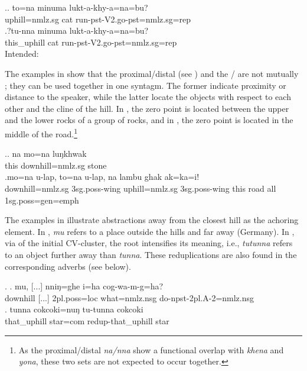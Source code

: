 \ex.\ag. to=na minuma lukt-a-khy-a=na=bu?\\
uphill{\sc =nmlz.sg} cat run{\sc [3sg]-pst-V2.go-pst=nmlz.sg=rep}\\
\bg.?tu-nna minuma lukt-a-khy-a=na=bu?\\
this\_uphill cat run{\sc [3sg]-pst-V2.go-pst=nmlz.sg=rep}\\
Intended: 
 
The examples in \Next show that the proximal/distal  (see  ) and the /  are not mutually ; they can be used together in one syntagm. The former indicate proximity or distance to the speaker, while the latter locate the objects with respect to each other and the cline of the hill. In \Next[a], the zero point is located between the upper and the lower rocks of a group of rocks, and in \Next[b], the zero point is located in the middle of the road.\footnote{As the proximal/distal  \emph{na/nna} show a functional overlap with \emph{khena} and \emph{yona}, these two sets are not expected to occur together.}

\ex.\ag.  na   mo=na  luŋkhwak\\
this downhill{\sc =nmlz.sg} stone\\
 
\bg.mo=na  u-lap,          to=na  u-lap,          na   lambu ghak ak=ka=i!\\
downhill{\sc =nmlz.sg} {\sc 3sg.poss-}wing uphill{\sc =nmlz.sg}  {\sc 3sg.poss-}wing this road all {\sc 1sg.poss=gen=emph}\\
  


The examples in \Next illustrate abstractions away from the closest hill as the achoring element. In \Next[a],  \emph{mu} refers to a place outside the hills and far away (Germany). In \Next[b], via  of the initial CV-cluster, the root  intensifies its meaning, i.e., \emph{tutunna} refers to an object further away than \emph{tunna}. These reduplications are also found in the corresponding adverbs (see  below). 

\ex. \ag. mu, [...] nniŋ=ghe i=ha cog-wa-m-g=ha?\\
	downhill [...] {\sc 2pl.poss=loc} what{\sc =nmlz.nsg} do{\sc -npst-2pl.A-2=nmlz.nsg}\\
	 
\bg. tunna cokcoki=nuŋ tu-tunna cokcoki\\
		that\_uphill star{\sc =com}	{\sc redup-}that\_uphill star\\


